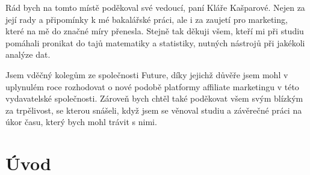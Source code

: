 \documentclass[12pt,twoside,openany]{fithesis}
\makeatletter
\def\cleardoublepage{\clearpage\if@twoside \ifodd\c@page\else
        \thispagestyle{empty}
        \hbox{}\newpage\if@twocolumn\hbox{}\newpage\fi\fi\fi}
\makeatother
\begin{document}
\SkipTocEntry\begin{ThesisThanks} %

\vspace{20mm}

Rád bych na tomto místě poděkoval své vedoucí, paní Kláře Kašparové. 
Nejen za její rady a připomínky k mé bakalářské práci, ale i za 
zaujetí pro marketing, které na mě do značné míry přenesla. Stejně tak 
děkuji všem, kteří mi při studiu pomáhali pronikat do tajů matematiky a 
statistiky, nutných nástrojů při jakékoli analýze dat. 

Jsem vděčný kolegům ze společnosti Future, díky jejichž důvěře
jsem mohl v uplynulém roce rozhodovat o nové podobě platformy affiliate
marketingu v této vydavatelské společnosti. Zároveň bych 
chtěl také poděkovat všem svým blízkým za trpělivost, se kterou snášeli, 
když jsem se věnoval studiu a závěrečné práci na úkor času, který 
bych mohl trávit s nimi.

\end{ThesisThanks}
\normalsize







\tableofcontents %

\MainMatter


\cleardoublepage
\chapter*{Úvod}
{}
\end{document}
